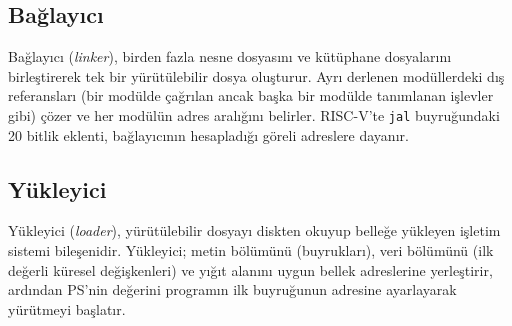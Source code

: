 \subsection{Bağlayıcı}
Bağlayıcı (\textit{linker}), birden fazla nesne dosyasını ve kütüphane dosyalarını birleştirerek tek bir yürütülebilir dosya oluşturur. Ayrı derlenen modüllerdeki dış referansları (bir modülde çağrılan ancak başka bir modülde tanımlanan işlevler gibi) çözer ve her modülün adres aralığını belirler. RISC-V'te \texttt{jal} buyruğundaki 20 bitlik eklenti, bağlayıcının hesapladığı göreli adreslere dayanır.

\subsection{Yükleyici}
Yükleyici (\textit{loader}), yürütülebilir dosyayı diskten okuyup belleğe yükleyen işletim sistemi bileşenidir. Yükleyici; metin bölümünü (buyrukları), veri bölümünü (ilk değerli küresel değişkenleri) ve yığıt alanını uygun bellek adreslerine yerleştirir, ardından PS'nin değerini programın ilk buyruğunun adresine ayarlayarak yürütmeyi başlatır.

